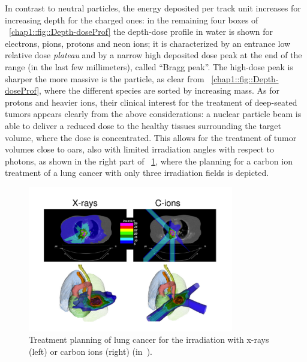 In contrast to neutral particles, the energy deposited per track unit increases for increasing depth for the charged ones: in the remaining four boxes of \figurename~\ref{chap1::fig::Depth-doseProf} the depth-dose profile in water is shown for electrons, pions, protons and neon ions; it is characterized by an entrance low relative dose \textit{plateau} and by a narrow high deposited dose peak at the end of the range (in the last few millimeters), called \enquote{Bragg peak}. The high-dose peak is sharper the more massive is the particle, as clear from \figurename~\ref{chap1::fig::Depth-doseProf}, where the different species are sorted by increasing mass. As for protons and heavier ions, their clinical interest for the treatment of deep-seated tumors appears clearly from the above considerations: a nuclear particle beam is able to deliver a reduced dose to the healthy tissues surrounding the target volume, where the dose is concentrated. This allows for the treatment of tumor volumes close to \glspl{oar}, also with limited irradiation angles with respect to photons, as shown in the right part of \figurename~\ref{chap1::fig::XraysCionsFields}, where the planning for a carbon ion treatment of a lung cancer with only three irradiation fields is depicted. 

\begin{figure}[!htbp]
\centering
\includegraphics[width=0.8\textwidth]{03_GraphicFiles/chapter1_Introduction/xRayCions_fields.pdf}
\caption{Treatment planning of lung cancer for the irradiation with x-rays (left) or carbon ions (right) (in~\cite{Durante2016}).}
\label{chap1::fig::XraysCionsFields}
\end{figure} 

